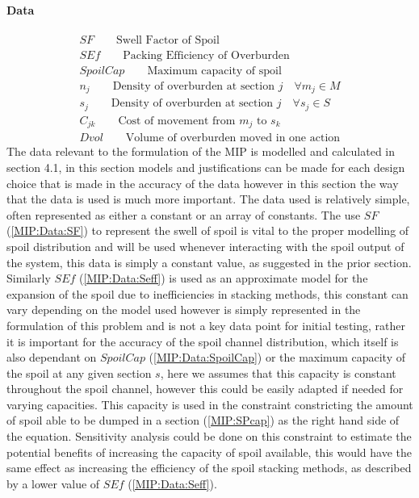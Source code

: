 \paragraph*{Data}
\begin{align}
\label{MIP:Data:SF}
SF \qquad \text{Swell Factor of Spoil}\\
\label{MIP:Data:Seff}
SEf \qquad \text{Packing Efficiency of Overburden}\\
\label{MIP:Data:SpoilCap}
SpoilCap \qquad \text{Maximum capacity of spoil}\\
\label{MIP:Data:n}
n_{j} \qquad \text{Density of overburden at section $j$} \quad \forall m_{j}  \in M\\
\label{MIP:Data:s}
s_{j} \qquad \text{Density of overburden at section $j$} \quad \forall s_{j}  \in S\\
\label{MIP:Cost}
C_{jk} \qquad \text{Cost of movement from $m_{j}$ to $s_k$ }\\
\label{MIPDvol}
Dvol \qquad \text{Volume of overburden moved in one action}
\end{align}
The data relevant to the formulation of the MIP is modelled and calculated in section 4.1, in this section models and justifications can be made for each design choice that is made in the accuracy of the data however in this section the way that the data is used is much more important. The data used is relatively simple, often represented as either a constant or an array of constants. The use $SF$ (\ref{MIP:Data:SF}) to represent the swell of spoil is vital to the proper modelling of spoil distribution and will be used whenever interacting with the spoil output of the system, this data is simply a constant value, as suggested in the prior section. Similarly $SEf$ (\ref{MIP:Data:Seff}) is used as an approximate model for the expansion of the spoil due to inefficiencies in stacking methods, this constant can vary depending on the model used however is simply represented in the formulation of this problem and is not a key data point for initial testing, rather it is important for the accuracy of the spoil channel distribution, which itself is also dependant on $SpoilCap$ (\ref{MIP:Data:SpoilCap}) or the maximum capacity of the spoil at any given section $s$, here we assumes that this capacity is constant throughout the spoil channel, however this could be easily adapted if needed for varying capacities. This capacity is used in the constraint constricting the amount of spoil able to be dumped in a section (\ref{MIP:SPcap}) as the right hand side of the equation. Sensitivity analysis could be done on this constraint to estimate the potential benefits of increasing the capacity of spoil available, this would have the same effect as increasing the efficiency of the spoil stacking methods, as described by a lower value of $SEf$ (\ref{MIP:Data:Seff}).\\
